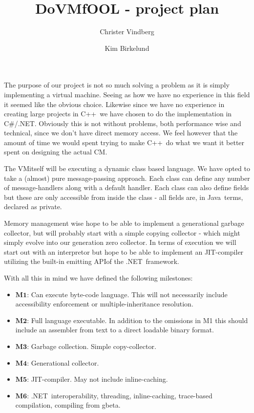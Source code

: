 \documentclass[onside,10pt,left=1cm]{article}
\author{Christer Vindberg \and Kim Birkelund}
\title{DoVMfOOL - project plan}
\newcommand{\csharp}{C\#}
\newcommand{\dotnet}{.NET}
\newcommand{\cpp}{C++}
\newcommand{\java}{Java}
\newcommand{\jit}{JIT}
\newcommand{\gbeta}{gbeta}
\newcommand{\vm}{VM}
\newcommand{\api}{API}
\newcommand{\bold}[1]{$\mathbf{#1}$}
\begin{document}
\maketitle

\setcounter{secnumdepth}{2}

The purpose of our project is not so much solving a problem as it is
simply implementing a virtual machine. Seeing as how we have no
experience in this field it seemed like the obvious choice. Likewise
since we have no experience in creating large projects in \cpp~we have
chosen to do the implementation in \csharp/\dotnet. Obviously this is not
without problems, both performance wise and technical, since we don't
have direct memory access. We feel however that the amount of time
we would spent trying to make \cpp~do what we want it better spent on
designing the actual CM.

The \vm itself will be executing a dynamic class based language. We
have opted to take a (almost) pure message-passing approach. Each
class can define any number of message-handlers along with a default
handler. Each class can also define fields but these are only
accessible from inside the class - all fields are, in \java~terms,
declared as private. 

Memory management wise hope to be able to implement a generational
garbage collector, but will probably start with a simple copying
collector - which might simply evolve into our generation zero
collector. In terms of execution we will start out with an interpretor
but hope to be able to implement an \jit-compiler utilizing the built-in
emitting \api of the \dotnet~framework.

With all this in mind we have defined the following milestones:

\begin{itemize}

\item \bold{M1}: Can execute byte-code language. This will not
  necessarily include accessibility enforcement or
  multiple-inheritance resolution.

\item \bold{M2}: Full language executable. In addition to the
  omissions in M1 this should include an assembler from text to a
  direct loadable binary format.

\item \bold{M3}: Garbage collection. Simple copy-collector.

\item \bold{M4}: Generational collector.

\item \bold{M5}: \jit-compiler. May not include inline-caching.

\item \bold{M6}: \dotnet~interoperability, threading,
  inline-caching, trace-based compilation, compiling from \gbeta.

\end{itemize}
\end{document}
